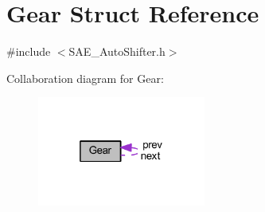 \hypertarget{struct_gear}{\section{Gear Struct Reference}
\label{struct_gear}
}


{\ttfamily \#include $<$S\-A\-E\-\_\-\-Auto\-Shifter.\-h$>$}



Collaboration diagram for Gear\-:\nopagebreak
\begin{figure}[H]
\begin{center}
\leavevmode
\includegraphics[width=157pt]{struct_gear__coll__graph}
\end{center}
\end{figure}
